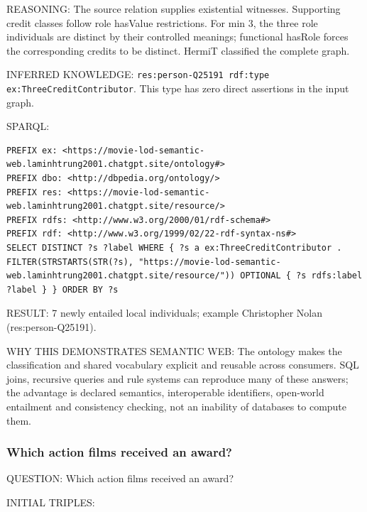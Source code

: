\documentclass[
  11pt,
]{article}
\begin{document}
REASONING: The source relation supplies existential witnesses.
Supporting credit classes follow role hasValue
restrict\allowbreak{}ions.\allowbreak{} For min 3, the three role
individuals are distinct by their controlled meanings; functional
hasRole forces the correspo\allowbreak{}nding credits to be distinct.
HermiT classified the complete graph.

INFERRED KNOWLEDGE:
\texttt{res:\allowbreak{}pers\allowbreak{}on-\allowbreak{}\allowbreak{}Q2519\allowbreak{}1 rdf:\allowbreak{}ty\allowbreak{}pe ex:\allowbreak{}\allowbreak{}Th\allowbreak{}ree\allowbreak{}Credi\allowbreak{}t\allowbreak{}Contrib\allowbreak{}utor}.
This type has zero direct assertions in the input graph.

SPARQL:

\begin{verbatim}
PREFIX ex: <https://movie-lod-semantic-web.laminhtrung2001.chatgpt.site/ontology#>
PREFIX dbo: <http://dbpedia.org/ontology/>
PREFIX res: <https://movie-lod-semantic-web.laminhtrung2001.chatgpt.site/resource/>
PREFIX rdfs: <http://www.w3.org/2000/01/rdf-schema#>
PREFIX rdf: <http://www.w3.org/1999/02/22-rdf-syntax-ns#>
SELECT DISTINCT ?s ?label WHERE { ?s a ex:ThreeCreditContributor . FILTER(STRSTARTS(STR(?s), "https://movie-lod-semantic-web.laminhtrung2001.chatgpt.site/resource/")) OPTIONAL { ?s rdfs:label ?label } } ORDER BY ?s
\end{verbatim}

RESULT: 7 newly entailed local individuals; example Christopher Nolan
(res:\allowbreak{}per\allowbreak{}son-\allowbreak{}\allowbreak{}Q251\allowbreak{}91).\allowbreak{}

WHY THIS DEMONSTRATES SEMANTIC WEB: The ontology makes the
classifi\allowbreak{}cation and shared vocabulary explicit and reusable
across consumers. SQL joins, recursive queries and rule systems can
reproduce many of these answers; the advantage is declared semantics,
interope\allowbreak{}rable identifiers, open-world entailment and
consistency checking, not an inability of databases to compute them.

\subsubsection{Which action films received an
award?}\label{which-action-films-received-an-award}

QUESTION: Which action films received an award?

INITIAL TRIPLES:
\end{document}
